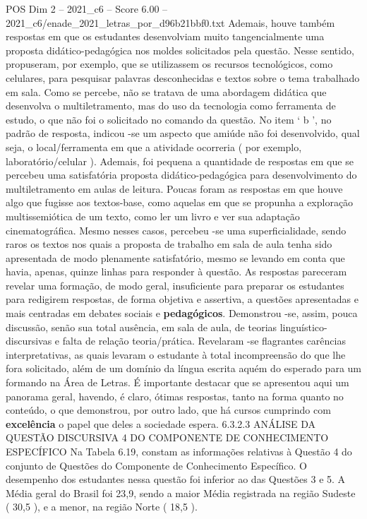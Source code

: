 \begin{textsample}{POS Dim 2 – 2021\_c6 – Score 6.00 – 2021\_c6/enade\_2021\_letras\_por\_d96b21bbf0.txt}
Ademais, houve também respostas em que os estudantes desenvolviam muito tangencialmente uma proposta didático-pedagógica nos moldes solicitados pela questão.
Nesse sentido, propuseram, por exemplo, que se utilizassem os recursos tecnológicos, como celulares, para pesquisar palavras desconhecidas e textos sobre o tema trabalhado em sala.
Como se percebe, não se tratava de uma abordagem didática que desenvolva o multiletramento, mas do uso da tecnologia como ferramenta de estudo, o que não foi o solicitado no comando da questão.
No item ‘ b ’, no padrão de resposta, indicou -se um aspecto que amiúde não foi desenvolvido, qual seja, o local/ferramenta em que a atividade ocorreria ( por exemplo, laboratório/celular ).
Ademais, foi pequena a quantidade de respostas em que se percebeu uma satisfatória proposta didático-pedagógica para desenvolvimento do multiletramento em aulas de leitura.
Poucas foram as respostas em que houve algo que fugisse aos textos-base, como aquelas em que se propunha a exploração multissemiótica de um texto, como ler um livro e ver sua adaptação cinematográfica.
Mesmo nesses casos, percebeu -se uma superficialidade, sendo raros os textos nos quais a proposta de trabalho em sala de aula tenha sido apresentada de modo plenamente satisfatório, mesmo se levando em conta que havia, apenas, quinze linhas para responder à questão.
As respostas pareceram revelar uma formação, de modo geral, insuficiente para preparar os estudantes para redigirem respostas, de forma objetiva e assertiva, a questões apresentadas e mais centradas em debates sociais e \textbf{pedagógicos}.
Demonstrou -se, assim, pouca discussão, senão sua total ausência, em sala de aula, de teorias linguístico-discursivas e falta de relação teoria/prática.
Revelaram -se flagrantes carências interpretativas, as quais levaram o estudante à total incompreensão do que lhe fora solicitado, além de um domínio da língua escrita aquém do esperado para um formando na Área de Letras.
É importante destacar que se apresentou aqui um panorama geral, havendo, é claro, ótimas respostas, tanto na forma quanto no conteúdo, o que demonstrou, por outro lado, que há cursos cumprindo com \textbf{excelência} o papel que deles a sociedade espera. 6.3.2.3 ANÁLISE DA QUESTÃO DISCURSIVA 4 DO COMPONENTE DE CONHECIMENTO ESPECÍFICO Na Tabela 6.19, constam as informações relativas à Questão 4 do conjunto de Questões do Componente de Conhecimento Específico.
O desempenho dos estudantes nessa questão foi inferior ao das Questões 3 e 5.
A Média geral do Brasil foi 23,9, sendo a maior Média registrada na região Sudeste ( 30,5 ), e a menor, na região Norte ( 18,5 ).

\end{textsample}
